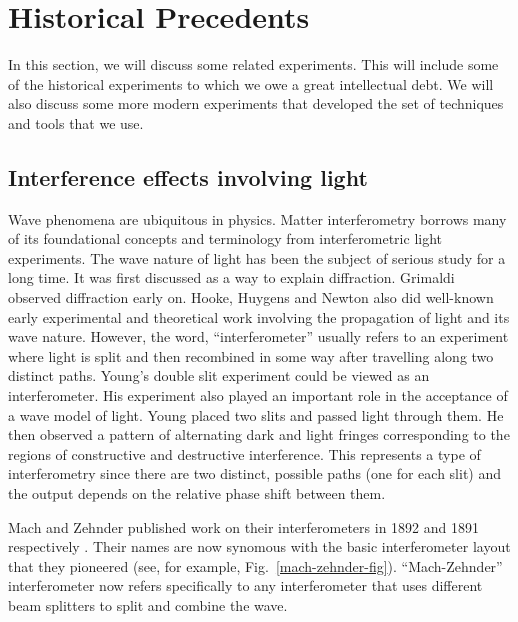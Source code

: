 \section{Historical Precedents}
In this section, we will discuss some related experiments. This will include some of the historical experiments to which we owe a great intellectual debt. We will also discuss some more modern experiments that developed the set of techniques and tools that we use. 
 \subsection{Interference effects involving light}
Wave phenomena are ubiquitous in physics. Matter interferometry borrows many of its foundational concepts and terminology from interferometric light experiments.
The wave nature of light has been the subject of serious study for a long time. It was first discussed as a way to explain diffraction.
Grimaldi observed diffraction early on. Hooke, Huygens and Newton also did well-known early experimental and theoretical work involving the propagation of light and its wave nature. 
However, the word, ``interferometer'' usually refers to an experiment where light is split and then recombined in some way after travelling along two distinct paths. 
Young's double slit experiment could be viewed as an interferometer. His experiment also played an important role in the acceptance of a wave model of light. Young placed two slits and passed light through them. He then observed a pattern of alternating dark and light fringes corresponding to the regions of constructive and destructive interference. This represents a type of interferometry since there are two distinct, possible paths (one for each slit) and the output depends on the relative phase shift between them. 

Mach and Zehnder published work on their interferometers in 1892 and 1891 respectively \cite{mach}\cite{zehnder}. Their names are now synomous with the basic interferometer layout that they pioneered (see, for example, Fig.~\ref{mach-zehnder-fig}).  ``Mach-Zehnder'' interferometer now refers specifically to any interferometer that uses different beam splitters to split and combine the wave.

